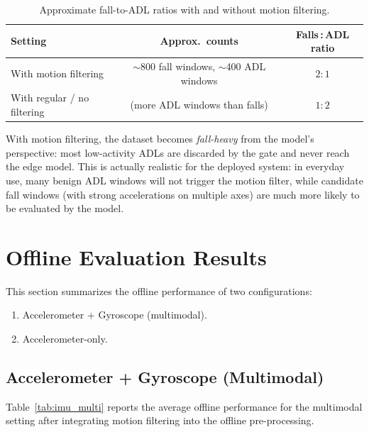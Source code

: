 \begin{table}[h]
    \centering
    \caption{Approximate fall-to-ADL ratios with and without motion filtering.}
    \label{tab:fall_adl_ratio}
    \begin{tabular}{lcc}
        \toprule
        Setting & Approx.\ counts & Falls\,:\,ADL ratio \\
        \midrule
        With motion filtering & $\sim$800 fall windows, $\sim$400 ADL windows & $2:1$ \\
        With regular / no filtering & (more ADL windows than falls) & $1:2$ \\
        \bottomrule
    \end{tabular}
\end{table}

With motion filtering, the dataset becomes \emph{fall-heavy} from the model's perspective: most low-activity ADLs are discarded by the gate and never reach the edge model. This is actually realistic for the deployed system: in everyday use, many benign ADL windows will not trigger the motion filter, while candidate fall windows (with strong accelerations on multiple axes) are much more likely to be evaluated by the model.

\section{Offline Evaluation Results}

This section summarizes the offline performance of two configurations:
\begin{enumerate}[label=\arabic*.]
    \item Accelerometer + Gyroscope (multimodal).
    \item Accelerometer-only.
\end{enumerate}

\subsection{Accelerometer + Gyroscope (Multimodal)}

Table~\ref{tab:imu_multi} reports the average offline performance for the multimodal setting after integrating motion filtering into the offline pre-processing.

